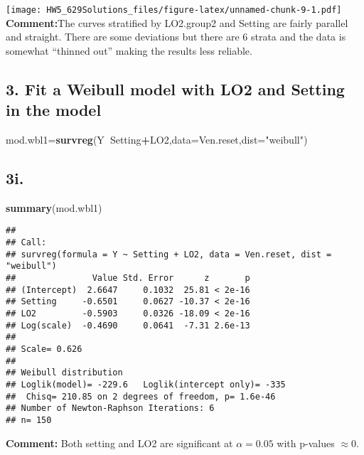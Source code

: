 \documentclass[]{article}
\newenvironment{Shaded}{\begin{snugshade}}{\end{snugshade}}
\newcommand{\DataTypeTok}[1]{\textcolor[rgb]{0.13,0.29,0.53}{#1}}
\newcommand{\KeywordTok}[1]{\textcolor[rgb]{0.13,0.29,0.53}{\textbf{#1}}}
\newcommand{\NormalTok}[1]{#1}
\newcommand{\OperatorTok}[1]{\textcolor[rgb]{0.81,0.36,0.00}{\textbf{#1}}}
\newcommand{\StringTok}[1]{\textcolor[rgb]{0.31,0.60,0.02}{#1}}
\begin{document}
\texttt{[image: HW5\_629Solutions\_files/figure-latex/unnamed-chunk-9-1.pdf]}
\textbf{Comment:}The curves stratified by LO2.group2 and Setting are
fairly parallel and straight. There are some deviations but there are 6
strata and the data is somewhat ``thinned out'' making the results less
reliable.

\hypertarget{fit-a-weibull-model-with-lo2-and-setting-in-the-model}{%
\subsection{3. Fit a Weibull model with LO2 and Setting in the
model}\label{fit-a-weibull-model-with-lo2-and-setting-in-the-model}}

\begin{Shaded}
\begin{Highlighting}[]
\NormalTok{mod.wbl1=}\KeywordTok{survreg}\NormalTok{(Y}\OperatorTok{~}\NormalTok{Setting}\OperatorTok{+}\NormalTok{LO2,}\DataTypeTok{data=}\NormalTok{Ven.reset,}\DataTypeTok{dist=}\StringTok{"weibull"}\NormalTok{)}
\end{Highlighting}
\end{Shaded}

\hypertarget{i.}{%
\subsection{3i.}\label{i.}}

\begin{Shaded}
\begin{Highlighting}[]
\KeywordTok{summary}\NormalTok{(mod.wbl1)}
\end{Highlighting}
\end{Shaded}

\begin{verbatim}
## 
## Call:
## survreg(formula = Y ~ Setting + LO2, data = Ven.reset, dist = "weibull")
##               Value Std. Error      z       p
## (Intercept)  2.6647     0.1032  25.81 < 2e-16
## Setting     -0.6501     0.0627 -10.37 < 2e-16
## LO2         -0.5903     0.0326 -18.09 < 2e-16
## Log(scale)  -0.4690     0.0641  -7.31 2.6e-13
## 
## Scale= 0.626 
## 
## Weibull distribution
## Loglik(model)= -229.6   Loglik(intercept only)= -335
##  Chisq= 210.85 on 2 degrees of freedom, p= 1.6e-46 
## Number of Newton-Raphson Iterations: 6 
## n= 150
\end{verbatim}

\textbf{Comment:} Both setting and LO2 are significant at
\(\alpha=0.05\) with p-values \(\approx0\).
\end{document}
